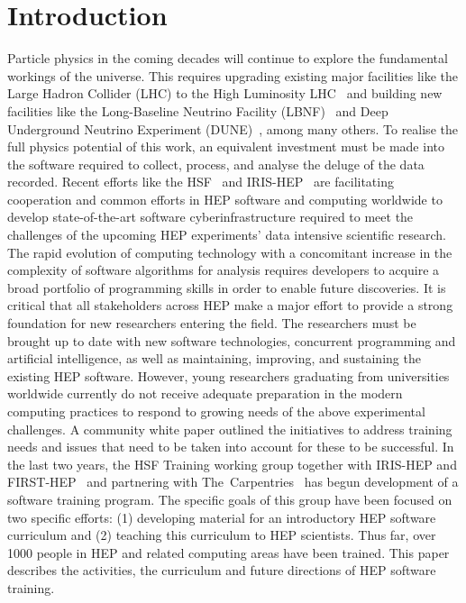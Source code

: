 \documentclass[twocolumn]{svjour3}          %
\begin{document}
\section{Introduction}
\label{intro}
Particle physics in the coming decades will continue to explore the fundamental workings of the universe. This requires  upgrading existing major facilities like the Large Hadron Collider (LHC) to the High Luminosity LHC~\cite{hl-lhc} and building new facilities like the Long-Baseline Neutrino Facility (LBNF)~\cite{papadimitriou2017design} and Deep Underground Neutrino Experiment (DUNE)~\cite{dune}, among many others.  To realise the full physics potential of this work, an equivalent investment must be made into the software required to collect, process, and analyse the deluge of the data recorded. Recent efforts like the HSF~\cite{HSF-homepage} and IRIS-HEP~\cite{iris-hep} are facilitating cooperation and common efforts in HEP software and computing worldwide to develop state-of-the-art software cyberinfrastructure required to meet the challenges of the upcoming HEP experiments'  data intensive scientific research. The rapid evolution of computing technology with a  concomitant increase in the complexity of software algorithms for analysis requires developers to acquire a broad portfolio of programming skills in order to enable future discoveries. It is critical that all stakeholders across HEP make a major effort to provide a strong foundation for new researchers entering the field. The researchers must be brought up to date with new software technologies, concurrent programming and artificial intelligence, as well as maintaining, improving, and sustaining the existing HEP software. However, young researchers graduating from universities worldwide currently do not receive adequate preparation in the modern computing practices to respond to growing needs of the above experimental challenges. A community white paper \cite{hsfwptraining} outlined the initiatives to address training needs and issues that need to be taken into account for these to be successful. In the last two years, the HSF Training working group together with IRIS-HEP and FIRST-HEP~\cite{first-hep} and partnering with The~Carpentries~\cite{carpentries} has begun development of a software training program. The specific goals of this group have been focused on two specific efforts: (1) developing material for an introductory HEP software curriculum and (2) teaching this curriculum to HEP scientists. Thus far, over 1000 people in HEP and related computing areas have been trained. This paper describes the activities, the curriculum and future directions of HEP software training.
%
\end{document}
